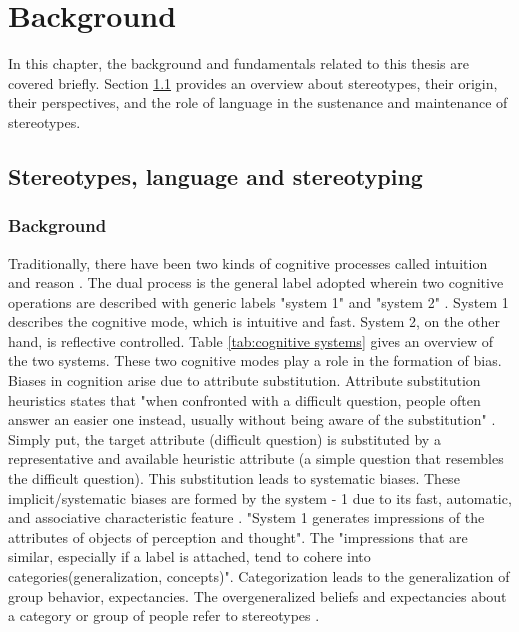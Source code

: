 \chapter{Background}

In this chapter, the background and fundamentals related to this thesis are covered briefly. Section \ref{stereotypes, language} provides an overview about stereotypes, their origin, their perspectives, and the role of language in the sustenance and maintenance of stereotypes. 

\section{Stereotypes, language and stereotyping} \label{stereotypes, language}
\subsection{Background}

Traditionally, there have been two kinds of cognitive processes called intuition and reason \cite{kahneman2002representativeness}. The dual process is the general label adopted wherein two cognitive operations are described with generic labels "system 1" and "system 2" \cite{kahneman2002representativeness}. System 1 describes the cognitive mode, which is intuitive and fast. System 2, on the other hand, is reflective controlled. Table \ref{tab:cognitive systems} gives an overview of the two systems. These two cognitive modes play a role in the formation of bias. Biases in cognition arise due to attribute substitution. Attribute substitution heuristics states that "when confronted with a difficult question, people often answer an easier one instead, usually
without being aware of the substitution" \cite{kahneman2002representativeness}. Simply put, the target attribute (difficult question) is substituted by a representative and available heuristic attribute (a simple question that resembles the difficult question). This substitution leads to systematic biases. These implicit/systematic biases are formed by the system - 1 due to its fast, automatic, and associative characteristic feature \cite{kahneman2002representativeness}. "System 1 generates impressions of the attributes of objects of perception and thought"\cite{kahneman2003maps}. The "impressions that are similar, especially if a label is attached, tend to cohere into categories(generalization, concepts)"\cite{fiske1998stereotyping}. Categorization leads to the generalization of group behavior, expectancies. The overgeneralized beliefs and expectancies about a category or group of people refer to stereotypes \cite{allport1954nature}\cite{fiske1998stereotyping}. 

